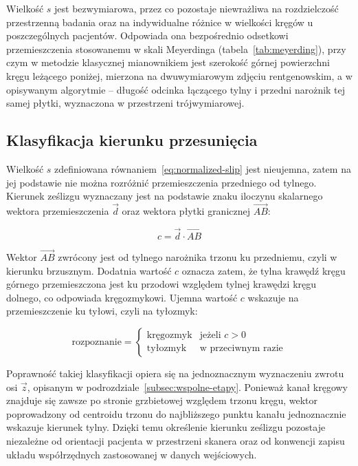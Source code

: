 Wielkość $s$ jest bezwymiarowa, przez co pozostaje niewrażliwa na rozdzielczość przestrzenną badania oraz na indywidualne różnice w wielkości kręgów u poszczególnych pacjentów.
Odpowiada ona bezpośrednio odsetkowi przemieszczenia stosowanemu w skali Meyerdinga (tabela~\ref{tab:meyerding}), przy czym w metodzie klasycznej mianownikiem jest szerokość górnej powierzchni kręgu leżącego poniżej, mierzona na dwuwymiarowym zdjęciu rentgenowskim, a w opisywanym algorytmie -- długość odcinka łączącego tylny i przedni narożnik tej samej płytki, wyznaczona w przestrzeni trójwymiarowej.

\subsection{Klasyfikacja kierunku przesunięcia}
\label{subsec:kierunek}

Wielkość $s$ zdefiniowana równaniem~\eqref{eq:normalized-slip} jest nieujemna,  zatem na jej podstawie nie można rozróżnić przemieszczenia przedniego od tylnego.
Kierunek ześlizgu wyznaczany jest na podstawie znaku iloczynu skalarnego wektora przemieszczenia $\vec{d}$ oraz wektora płytki granicznej $\vec{AB}$:

\begin{equation} \label{eq:direction-sign}
    c = \vec{d} \cdot \vec{AB}
\end{equation}

Wektor $\vec{AB}$ zwrócony jest od tylnego narożnika trzonu ku przedniemu, czyli w kierunku brzusznym.
Dodatnia wartość $c$ oznacza zatem, że tylna krawędź kręgu górnego przemieszczona jest ku przodowi względem tylnej krawędzi kręgu dolnego, co odpowiada kręgozmykowi.
Ujemna wartość $c$ wskazuje na przemieszczenie ku tyłowi, czyli na tyłozmyk:

\begin{equation} \label{eq:classification}
    \text{rozpoznanie} =
    \begin{cases}
        \text{kręgozmyk} & \text{jeżeli } c > 0 \\
        \text{tyłozmyk}  & \text{w przeciwnym razie}
    \end{cases}
\end{equation}

Poprawność takiej klasyfikacji opiera się na jednoznacznym wyznaczeniu zwrotu osi $\vec{z}$, opisanym w podrozdziale~\ref{subsec:wspolne-etapy}.
Ponieważ kanał kręgowy znajduje się zawsze po stronie grzbietowej względem trzonu kręgu, wektor poprowadzony od centroidu trzonu do najbliższego punktu kanału jednoznacznie wskazuje kierunek tylny.
Dzięki temu określenie kierunku ześlizgu pozostaje niezależne od orientacji pacjenta w przestrzeni skanera oraz od konwencji zapisu układu współrzędnych zastosowanej w danych wejściowych.

